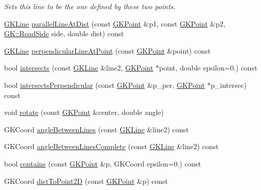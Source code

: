 \begin{DoxyCompactItemize}
\begin{DoxyCompactList}\small\item\em Sets this line to be the one defined by these two points. \end{DoxyCompactList}\item 
\hyperlink{classGKLine}{G\+K\+Line} \hyperlink{classGKLine_ac6cf49aeec17fe932979e746f74dbd5d}{parallel\+Line\+At\+Dist} (const \hyperlink{classGKPoint}{G\+K\+Point} \&p1, const \hyperlink{classGKPoint}{G\+K\+Point} \&p2, \hyperlink{namespaceGK_adbf6d461cf314c17e29ca660da291274}{G\+K\+::\+Road\+Side} side, double dist) const 
\item 
\hyperlink{classGKLine}{G\+K\+Line} \hyperlink{classGKLine_a528540503450e6ee7865ca702cc08fe2}{perpendicular\+Line\+At\+Point} (const \hyperlink{classGKPoint}{G\+K\+Point} \&point) const 
\item 
bool \hyperlink{classGKLine_a580f3c2126348737a724f14241340086}{intersects} (const \hyperlink{classGKLine}{G\+K\+Line} \&line2, \hyperlink{classGKPoint}{G\+K\+Point} $\ast$point, double epsilon=0.) const 
\item 
bool \hyperlink{classGKLine_aa0618666fd2cbf95e56516819a8ac92e}{intersects\+Perpendicular} (const \hyperlink{classGKPoint}{G\+K\+Point} \&p\+\_\+per, \hyperlink{classGKPoint}{G\+K\+Point} $\ast$p\+\_\+intersec) const 
\item 
void \hyperlink{classGKLine_a2b434e208cbdf9e8566bcac7516e6f03}{rotate} (const \hyperlink{classGKPoint}{G\+K\+Point} \&center, double angle)
\item 
G\+K\+Coord \hyperlink{classGKLine_a150b5fef0994e2c8a22ff1e41ebe6cba}{angle\+Between\+Lines} (const \hyperlink{classGKLine}{G\+K\+Line} \&line2) const 
\item 
G\+K\+Coord \hyperlink{classGKLine_a503e44cfd91aafeac05ec182a439abd4}{angle\+Between\+Lines\+Complete} (const \hyperlink{classGKLine}{G\+K\+Line} \&line2) const 
\item 
bool \hyperlink{classGKLine_a1b390da084e212728a7550fcd0434f5b}{contains} (const \hyperlink{classGKPoint}{G\+K\+Point} \&p, G\+K\+Coord epsilon=0.) const 
\item 
G\+K\+Coord \hyperlink{classGKLine_a118e861901318b0728dcda414a3199f8}{dist\+To\+Point2D} (const \hyperlink{classGKPoint}{G\+K\+Point} \&p) const 
\end{DoxyCompactItemize}
